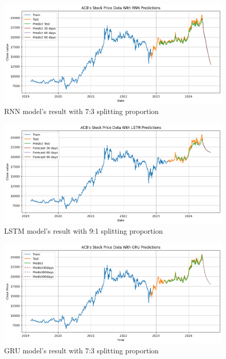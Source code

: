 \documentclass{ieeeojies}
\begin{document}
\begin{figure}[H]
  \centering
  \begin{minipage}{0.8\linewidth}
    \centering
    \includegraphics[width=\linewidth]{bibliography/ACB-RNN-7-3.png}
    \caption{RNN model's result with 7:3 splitting proportion}
    \label{fig17}
  \end{minipage}
\end{figure}
\begin{figure}[H]
  \centering
  \begin{minipage}{0.8\linewidth}
    \centering
    \includegraphics[width=\linewidth]{bibliography/ACB-LSTM-8-2.png}
    \caption{LSTM model's result with 9:1 splitting proportion}
    \label{fig18}
  \end{minipage}
\end{figure}
\begin{figure}[H]
  \centering
  \begin{minipage}{0.8\linewidth}
    \centering
    \includegraphics[width=\linewidth]{bibliography/ACB-GRU-7-3.png}
    \caption{GRU model's result with 7:3 splitting proportion}
    \label{fig8}
  \end{minipage}
\end{figure}
\end{document}
